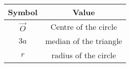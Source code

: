 \begin{tabular}[12pt]{ |c|c|}
    \hline
	\textbf{Symbol} & \textbf{Value} \\
    \hline
    $\vec{O}$ & Centre of the circle\\
    \hline 
    $3a$ & median of the triangle \\
    \hline
    $r$ & radius of the  circle \\

    \hline
    \end{tabular}
